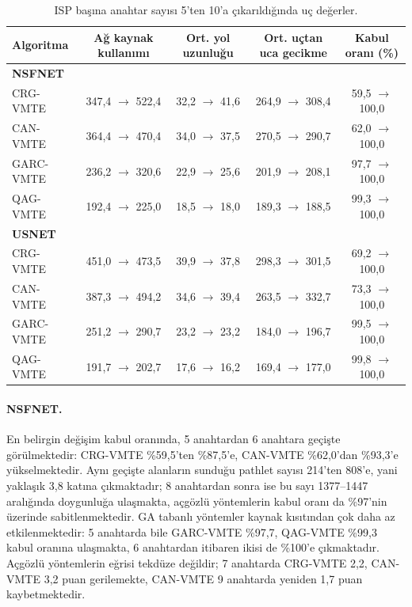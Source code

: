 \documentclass[10pt,twocolumn]{article}
\begin{document}
\begin{table}[!t]
\centering
\caption{ISP başına anahtar sayısı 5'ten 10'a çıkarıldığında uç değerler.}
\label{tab:isp}
\small
\begin{tabular}{lcccc}
\toprule
Algoritma & Ağ kaynak kullanımı & Ort. yol uzunluğu & Ort. uçtan uca gecikme & Kabul oranı (\%) \\
\midrule
\multicolumn{5}{l}{\textbf{NSFNET}} \\
CRG-VMTE & 347,4 $\rightarrow$ 522,4 & 32,2 $\rightarrow$ 41,6 & 264,9 $\rightarrow$ 308,4 & 59,5 $\rightarrow$ 100,0 \\
CAN-VMTE & 364,4 $\rightarrow$ 470,4 & 34,0 $\rightarrow$ 37,5 & 270,5 $\rightarrow$ 290,7 & 62,0 $\rightarrow$ 100,0 \\
GARC-VMTE & 236,2 $\rightarrow$ 320,6 & 22,9 $\rightarrow$ 25,6 & 201,9 $\rightarrow$ 208,1 & 97,7 $\rightarrow$ 100,0 \\
QAG-VMTE & 192,4 $\rightarrow$ 225,0 & 18,5 $\rightarrow$ 18,0 & 189,3 $\rightarrow$ 188,5 & 99,3 $\rightarrow$ 100,0 \\
\midrule
\multicolumn{5}{l}{\textbf{USNET}} \\
CRG-VMTE & 451,0 $\rightarrow$ 473,5 & 39,9 $\rightarrow$ 37,8 & 298,3 $\rightarrow$ 301,5 & 69,2 $\rightarrow$ 100,0 \\
CAN-VMTE & 387,3 $\rightarrow$ 494,2 & 34,6 $\rightarrow$ 39,4 & 263,5 $\rightarrow$ 332,7 & 73,3 $\rightarrow$ 100,0 \\
GARC-VMTE & 251,2 $\rightarrow$ 290,7 & 23,2 $\rightarrow$ 23,2 & 184,0 $\rightarrow$ 196,7 & 99,5 $\rightarrow$ 100,0 \\
QAG-VMTE & 191,7 $\rightarrow$ 202,7 & 17,6 $\rightarrow$ 16,2 & 169,4 $\rightarrow$ 177,0 & 99,8 $\rightarrow$ 100,0 \\
\bottomrule
\end{tabular}
\end{table}

\paragraph{NSFNET.} En belirgin değişim kabul oranında, 5 anahtardan 6 anahtara geçişte görülmektedir: CRG-VMTE \%59,5'ten \%87,5'e, CAN-VMTE \%62,0'dan \%93,3'e yükselmektedir. Aynı geçişte alanların sunduğu pathlet sayısı 214'ten 808'e, yani yaklaşık 3,8 katına çıkmaktadır; 8 anahtardan sonra ise bu sayı 1377--1447 aralığında doygunluğa ulaşmakta, açgözlü yöntemlerin kabul oranı da \%97'nin üzerinde sabitlenmektedir. GA tabanlı yöntemler kaynak kısıtından çok daha az etkilenmektedir: 5 anahtarda bile GARC-VMTE \%97,7, QAG-VMTE \%99,3 kabul oranına ulaşmakta, 6 anahtardan itibaren ikisi de \%100'e çıkmaktadır. Açgözlü yöntemlerin eğrisi tekdüze değildir; 7 anahtarda CRG-VMTE 2,2, CAN-VMTE 3,2 puan gerilemekte, CAN-VMTE 9 anahtarda yeniden 1,7 puan kaybetmektedir.
\end{document}
